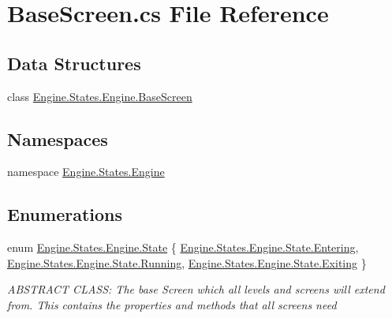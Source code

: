 \hypertarget{a00194}{}\section{Base\+Screen.\+cs File Reference}
\label{a00194}
\subsection*{Data Structures}
\begin{DoxyCompactItemize}
\item 
class \hyperlink{a00550}{Engine.\+States.\+Engine.\+Base\+Screen}
\end{DoxyCompactItemize}
\subsection*{Namespaces}
\begin{DoxyCompactItemize}
\item 
namespace \hyperlink{a00276}{Engine.\+States.\+Engine}
\end{DoxyCompactItemize}
\subsection*{Enumerations}
\begin{DoxyCompactItemize}
\item 
enum \hyperlink{a00276_a523ba47df707c4a9f45f2d7c7c6bf8ab}{Engine.\+States.\+Engine.\+State} \{ \hyperlink{a00276_a523ba47df707c4a9f45f2d7c7c6bf8aba8509939e44cc05f7a4da43eaa87e45c4}{Engine.\+States.\+Engine.\+State.\+Entering}, 
\hyperlink{a00276_a523ba47df707c4a9f45f2d7c7c6bf8aba5bda814c4aedb126839228f1a3d92f09}{Engine.\+States.\+Engine.\+State.\+Running}, 
\hyperlink{a00276_a523ba47df707c4a9f45f2d7c7c6bf8aba0657d962b72e6f1f37dda8dad3684cb8}{Engine.\+States.\+Engine.\+State.\+Exiting}
 \}\begin{DoxyCompactList}\small\item\em A\+B\+S\+T\+R\+A\+CT C\+L\+A\+SS\+: The base Screen which all levels and screens will extend from. This contains the properties and methods that all screens need \end{DoxyCompactList}
\end{DoxyCompactItemize}
